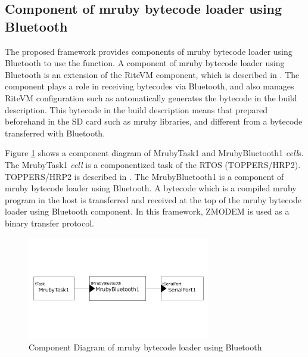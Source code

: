 \documentclass[conference,compsoc]{IEEEtran}
\begin{document}
\subsection{Component of mruby bytecode loader using Bluetooth}
The proposed framework provides components of mruby bytecode loader using Bluetooth to use the function.
A component of mruby bytecode loader using Bluetooth is an extension of the RiteVM component, which is described in \cite{7153813}.
The component plays a role in receiving bytecodes via Bluetooth, and also manages RiteVM configuration such as automatically generates the bytecode in the build description.
This bytecode in the build description means that prepared beforehand in the SD card such as mruby libraries, and different from a bytecode transferred with Bluetooth.

Figure \ref{fig:component_bluetooth} shows a component diagram of MrubyTask1 and MrubyBluetooth1 {\it cell}s.
The MrubyTask1 {\it cell} is a componentized task of the RTOS (TOPPERS/HRP2).
TOPPERS/HRP2 is described in \cite{6913200}.
The MrubyBluetooth1 is a component of mruby bytecode loader using Bluetooth.
A bytecode which is a compiled mruby program in the host is transferred and received at the top of the mruby bytecode loader using Bluetooth component.
In this framework, ZMODEM \cite{forsberg1988zmodem} is used as a binary transfer protocol.

\begin{figure}[t]
    \centering
    \includegraphics[width=8cm,clip]{figure/component_bluetooth.pdf}
    \caption{Component Diagram of mruby bytecode loader using Bluetooth}
    \label{fig:component_bluetooth}
\end{figure}
\end{document}
